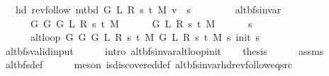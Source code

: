 \begin{isabellebody}
\ \ \ {\isachardoublequoteopen}hd\ {\isacharparenleft}{\kern0pt}rev{\isacharunderscore}{\kern0pt}follow\ {\isacharparenleft}{\kern0pt}m{\isacharunderscore}{\kern0pt}tbd\ G\ L\ R\ s\ t\ M{\isacharparenright}{\kern0pt}\ v{\isacharparenright}{\kern0pt}\ {\isacharequal}{\kern0pt}\ s{\isachardoublequoteclose}%
\endisataginvisible
{\isafoldinvisible}%
%
\isadeliminvisible
\isanewline
%
\endisadeliminvisible
%
\isadelimproof
%
\endisadelimproof
%
\isatagproof
{}\isamarkupfalse%
\ {\isacharminus}{\kern0pt}\isanewline
\ \ \isamarkupfalse%
\isanewline
\ \ \ \ {\isachardoublequoteopen}alt{\isacharunderscore}{\kern0pt}bfs{\isacharunderscore}{\kern0pt}invar{\isacharprime}{\kern0pt}\isanewline
\ \ \ \ \ \ {\isacharparenleft}{\kern0pt}G{}\ G\ {\isacharparenleft}{\kern0pt}G{}\ L\ R\ s\ t\ M{\isacharparenright}{\kern0pt}{\isacharparenright}{\kern0pt}\isanewline
\ \ \ \ \ \ {\isacharparenleft}{\kern0pt}G{}\ L\ R\ s\ t\ M{\isacharparenright}{\kern0pt}\isanewline
\ \ \ \ \ \ s\isanewline
\ \ \ \ \ \ {\isacharparenleft}{\kern0pt}alt{\isacharunderscore}{\kern0pt}loop\ {\isacharparenleft}{\kern0pt}G{}\ G\ {\isacharparenleft}{\kern0pt}G{}\ L\ R\ s\ t\ M{\isacharparenright}{\kern0pt}{\isacharparenright}{\kern0pt}\ {\isacharparenleft}{\kern0pt}G{}\ L\ R\ s\ t\ M{\isacharparenright}{\kern0pt}\ s\ {\isacharparenleft}{\kern0pt}init\ s{\isacharparenright}{\kern0pt}{\isacharparenright}{\kern0pt}{\isachardoublequoteclose}\isanewline
\ \ \ \ \isamarkupfalse%
\ alt{\isacharunderscore}{\kern0pt}bfs{\isacharunderscore}{\kern0pt}valid{\isacharunderscore}{\kern0pt}input\isanewline
\ \ \ \ \isamarkupfalse%
\ {\isacharparenleft}{\kern0pt}intro\ alt{\isacharunderscore}{\kern0pt}bfs{\isacharunderscore}{\kern0pt}invar{\isacharunderscore}{\kern0pt}alt{\isacharunderscore}{\kern0pt}loop{\isacharunderscore}{\kern0pt}init{\isacharparenright}{\kern0pt}\isanewline
\ \ \isamarkupfalse%
\ {\isacharquery}{\kern0pt}thesis\isanewline
\ \ \ \ \isamarkupfalse%
\ assms\isanewline
\ \ \ \ \isamarkupfalse%
\ alt{\isacharunderscore}{\kern0pt}bfs{\isacharunderscore}{\kern0pt}def\isanewline
\ \ \ \ \isamarkupfalse%
\ {\isacharparenleft}{\kern0pt}meson\ is{\isacharunderscore}{\kern0pt}discovered{\isacharunderscore}{\kern0pt}def\ alt{\isacharunderscore}{\kern0pt}bfs{\isacharunderscore}{\kern0pt}invar{\isachardot}{\kern0pt}hd{\isacharunderscore}{\kern0pt}rev{\isacharunderscore}{\kern0pt}follow{\isacharunderscore}{\kern0pt}eq{\isacharunderscore}{\kern0pt}src{\isacharparenright}{\kern0pt}\isanewline

\end{isabellebody}
